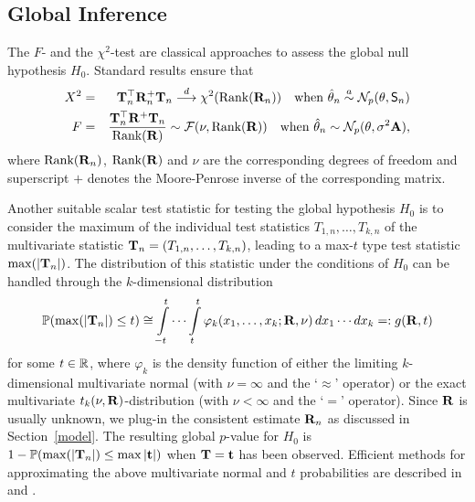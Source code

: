 \documentclass[12pt,a4paper]{article}
\begin{document}
\subsection{Global Inference}

\label{global} %

The $F$- and the $\chi^2$-test are classical approaches to assess the global
null hypothesis $H_0$. Standard results \citep[such as Theorem
3.5,][]{Serfling1980} ensure that 
\begin{eqnarray*}
X^2 & = & \T_n^\top \Cor_n^+ \T_n
\cL \chi^2(\Rg(\Cor_n)) \quad \text{when } \hat{\theta}_n \an
\N_p(\theta, \Sraw) \\
F & = & \frac{\T_n^\top \Cor^+ \T_n}{\Rg(\Cor)} \sim \F(\nu, \Rg(\Cor)) \quad \text{%
when } \hat{\theta}_n \sim \N_p(\theta, \sigma^2 \A),
\end{eqnarray*}
where $\text{Rank}(\mathbf{R}_n)$, $\text{Rank}(\mathbf{R})$ and $\nu$ are the corresponding degrees of freedom
and superscript $+$ denotes the Moore-Penrose inverse of the corresponding
matrix.

Another suitable scalar test statistic for testing the global hypothesis $H_0
$ is to consider the maximum of the individual test statistics $T_{1,n}, \dots,
T_{k,n}$ of the multivariate statistic $\mathbf{T}_n = (T_{1,n}, \dots, T_{k,n})$, leading to a max-$t$ type
test statistic $\max(|\mathbf{T}_n|)$. The distribution of this statistic under the
conditions of $H_0$ can be handled through the $k$-dimensional distribution 
\begin{eqnarray}  \label{maxt}
\mathbb{P}(\max(|\mathbf{T}_n|) \le t) \cong \int\limits_{-t}^t \cdots \int\limits_{t}^t
\varphi_k(x_1, \dots, x_k; \mathbf{R}, \nu) \, dx_1 \cdots dx_k =: g(\mathbf{R}, t)
\end{eqnarray}
for some $t \in \mathbb{R}$, where $\varphi_k$ is the density function of either the
limiting $k$-dimensional multivariate normal (with $\nu = \infty$ and the `$%
\approx$' operator) or the exact multivariate $t_k(\nu, \mathbf{R})$-distribution
(with $\nu < \infty$ and the `$=$' operator). Since $\mathbf{R}$ is usually
unknown, we plug-in the consistent estimate $\mathbf{R}_n$ as discussed in
Section~\ref{model}.
The resulting global $p$-value for $H_0$ is $1 - \Prob(\max(|%
\T_n|) \le \max|\tt|)$ when $\mathbf{T} = \mathbf{t}$ has been observed. Efficient methods
for approximating the above multivariate normal and $t$ probabilities are
described in \cite{Genz1992,GenzBretz1999,BretzGenzHothorn2001} and \cite%
{GenzBretz2002}. %
\end{document}
